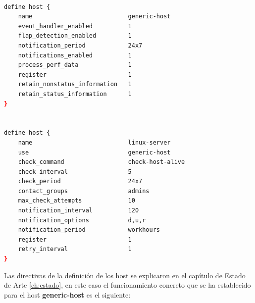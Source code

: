 \begin{lstlisting}[language=bash]

define host {
	name                           generic-host                        ; 
	event_handler_enabled          1                                   ; 
	flap_detection_enabled         1                                   ; 
	notification_period            24x7                                ; 
	notifications_enabled          1                                   ; 
	process_perf_data              1                                   ; 
	register                       1                                   ; 
	retain_nonstatus_information   1                                   ; 
	retain_status_information      1                                   ; 
}


define host {
	name                           linux-server                        ; 
	use                            generic-host                        ; 
	check_command                  check-host-alive                    ; 
	check_interval                 5                                   ; 
	check_period                   24x7                                ; 
	contact_groups                 admins                              ; 
	max_check_attempts             10                                  ; 
	notification_interval          120                                 ; 
	notification_options           d,u,r                               ; 
	notification_period            workhours                           ; 
	register                       1                                   ; 
	retry_interval                 1                                   ; 
}

\end{lstlisting}
\newpage
Las directivas de la definición de los host se explicaron en el capítulo de Estado de Arte \ref{ch:estado}, en este caso el funcionamiento concreto que se ha establecido para el host \textbf{generic-host} es el siguiente:

